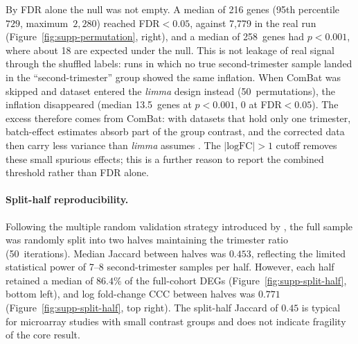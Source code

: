 \documentclass[11pt,a4paper]{article}
\begin{document}
By FDR alone the null was not empty. A median of 216 genes
(95th percentile~$729$, maximum~$2{,}280$) reached FDR${}<0.05$,
against 7{,}779 in the real run
(Figure~\ref{fig:supp-permutation}, right), and a median of
258~genes had $p<0.001$, where about 18 are expected under the
null. This is not leakage of real signal through the shuffled
labels: runs in which no true second-trimester sample landed in
the ``second-trimester'' group showed the same inflation. When
ComBat was skipped and dataset entered the \textit{limma} design
instead (50~permutations), the inflation disappeared (median
13.5~genes at $p<0.001$, 0 at FDR${}<0.05$). The excess therefore
comes from ComBat: with datasets that hold only one trimester,
batch-effect estimates absorb part of the group contrast, and the
corrected data then carry less variance than \textit{limma}
assumes \citep{Nygaard2016}. The $|\text{logFC}|>1$ cutoff
removes these small spurious effects; this is a further reason
to report the combined threshold rather than FDR alone.

\paragraph{Split-half reproducibility.}
Following the multiple random validation strategy introduced by
\citet{Michiels2005}, the full sample was randomly split into two
halves maintaining the trimester ratio (50~iterations). Median
Jaccard between halves was $0.453$, reflecting the limited
statistical power of 7--8 second-trimester samples per half.
However, each half retained a median of $86.4\%$ of the full-cohort
DEGs (Figure~\ref{fig:supp-split-half}, bottom left), and log
fold-change CCC between halves was $0.771$
(Figure~\ref{fig:supp-split-half}, top right). The split-half
Jaccard of $0.45$ is typical for microarray studies with small
contrast groups \citep{EinDor2006} and does not indicate fragility
of the core result.
\end{document}
